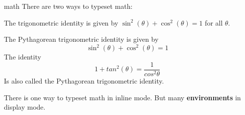 \copyrightTim

\begin{frame}[fragile]{math}
There are two ways to typeset math:

\begin{tcolorbox}[width=13cm, title={inline mode}, size=small]
    The trigonometric identity is given by \( \sin^2(\theta) + \cos^2(\theta) = 1 \) for all \( \theta \).
\end{tcolorbox}

 \begin{tcolorbox}[width=13cm, title={display mode}, size=small]
    The Pythagorean trigonometric identity is given by
    \begin{equation} \sin^2(\theta) + \cos^2(\theta) = 1 \end{equation}
    The identity
    \begin{equation} 1 + tan^2(\theta) = \frac{1}{cos^2\theta}\end{equation}
    Is also called the Pythagorean trigonometric identity.

\end{tcolorbox}

{\small There is one way to typeset math in inline mode.
But many \textbf{environments} in display mode.}
\end{frame}